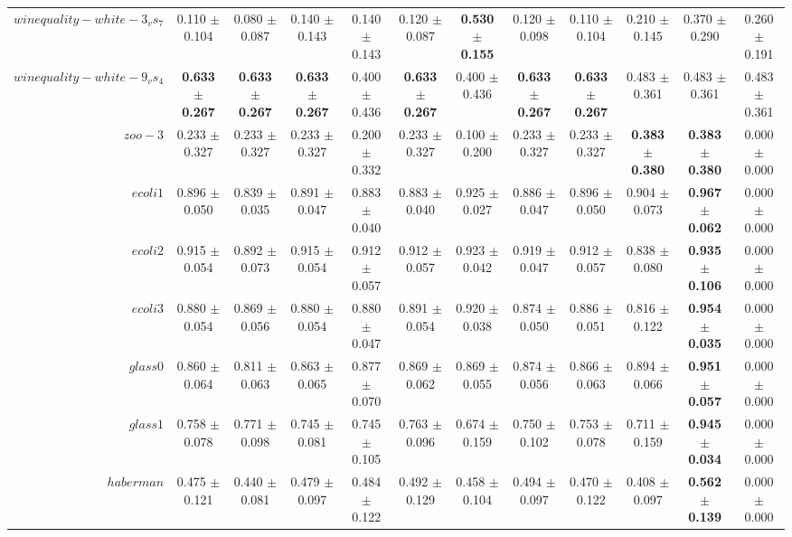 \begin{table}[!ht]
{\begin{tabular}{r c c c c c c c c c c c}
$winequality-white-3_vs_7$ & 0.110 $\pm$ 0.104 & 0.080 $\pm$ 0.087 & 0.140 $\pm$ 0.143 & 0.140 $\pm$ 0.143 & 0.120 $\pm$ 0.087 & \textbf{0.530 $\pm$ 0.155} & 0.120 $\pm$ 0.098 & 0.110 $\pm$ 0.104 & 0.210 $\pm$ 0.145 & 0.370 $\pm$ 0.290 & 0.260 $\pm$ 0.191 \\
$winequality-white-9_vs_4$ & \textbf{0.633 $\pm$ 0.267} & \textbf{0.633 $\pm$ 0.267} & \textbf{0.633 $\pm$ 0.267} & 0.400 $\pm$ 0.436 & \textbf{0.633 $\pm$ 0.267} & 0.400 $\pm$ 0.436 & \textbf{0.633 $\pm$ 0.267} & \textbf{0.633 $\pm$ 0.267} & 0.483 $\pm$ 0.361 & 0.483 $\pm$ 0.361 & 0.483 $\pm$ 0.361 \\
$zoo-3$ & 0.233 $\pm$ 0.327 & 0.233 $\pm$ 0.327 & 0.233 $\pm$ 0.327 & 0.200 $\pm$ 0.332 & 0.233 $\pm$ 0.327 & 0.100 $\pm$ 0.200 & 0.233 $\pm$ 0.327 & 0.233 $\pm$ 0.327 & \textbf{0.383 $\pm$ 0.380} & \textbf{0.383 $\pm$ 0.380} & 0.000 $\pm$ 0.000 \\
$ecoli1$ & 0.896 $\pm$ 0.050 & 0.839 $\pm$ 0.035 & 0.891 $\pm$ 0.047 & 0.883 $\pm$ 0.040 & 0.883 $\pm$ 0.040 & 0.925 $\pm$ 0.027 & 0.886 $\pm$ 0.047 & 0.896 $\pm$ 0.050 & 0.904 $\pm$ 0.073 & \textbf{0.967 $\pm$ 0.062} & 0.000 $\pm$ 0.000 \\
$ecoli2$ & 0.915 $\pm$ 0.054 & 0.892 $\pm$ 0.073 & 0.915 $\pm$ 0.054 & 0.912 $\pm$ 0.057 & 0.912 $\pm$ 0.057 & 0.923 $\pm$ 0.042 & 0.919 $\pm$ 0.047 & 0.912 $\pm$ 0.057 & 0.838 $\pm$ 0.080 & \textbf{0.935 $\pm$ 0.106} & 0.000 $\pm$ 0.000 \\
$ecoli3$ & 0.880 $\pm$ 0.054 & 0.869 $\pm$ 0.056 & 0.880 $\pm$ 0.054 & 0.880 $\pm$ 0.047 & 0.891 $\pm$ 0.054 & 0.920 $\pm$ 0.038 & 0.874 $\pm$ 0.050 & 0.886 $\pm$ 0.051 & 0.816 $\pm$ 0.122 & \textbf{0.954 $\pm$ 0.035} & 0.000 $\pm$ 0.000 \\
$glass0$ & 0.860 $\pm$ 0.064 & 0.811 $\pm$ 0.063 & 0.863 $\pm$ 0.065 & 0.877 $\pm$ 0.070 & 0.869 $\pm$ 0.062 & 0.869 $\pm$ 0.055 & 0.874 $\pm$ 0.056 & 0.866 $\pm$ 0.063 & 0.894 $\pm$ 0.066 & \textbf{0.951 $\pm$ 0.057} & 0.000 $\pm$ 0.000 \\
$glass1$ & 0.758 $\pm$ 0.078 & 0.771 $\pm$ 0.098 & 0.745 $\pm$ 0.081 & 0.745 $\pm$ 0.105 & 0.763 $\pm$ 0.096 & 0.674 $\pm$ 0.159 & 0.750 $\pm$ 0.102 & 0.753 $\pm$ 0.078 & 0.711 $\pm$ 0.159 & \textbf{0.945 $\pm$ 0.034} & 0.000 $\pm$ 0.000 \\
$haberman$ & 0.475 $\pm$ 0.121 & 0.440 $\pm$ 0.081 & 0.479 $\pm$ 0.097 & 0.484 $\pm$ 0.122 & 0.492 $\pm$ 0.129 & 0.458 $\pm$ 0.104 & 0.494 $\pm$ 0.097 & 0.470 $\pm$ 0.122 & 0.408 $\pm$ 0.097 & \textbf{0.562 $\pm$ 0.139} & 0.000 $\pm$ 0.000 \\

\end{tabular}}
\end{table}

